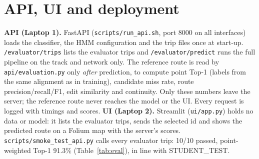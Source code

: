 \documentclass[11pt,a4paper]{article}
\begin{document}
\section{API, UI and deployment}
\textbf{API (Laptop 1).} FastAPI (\texttt{scripts/run\_api.sh}, port 8000 on all interfaces) loads the classifier, the
HMM configuration and the trip files once at start-up. \texttt{/evaluator/trips} lists the evaluator trips and
\texttt{/evaluator/predict} runs the full pipeline on the track and network only. The reference route is read by
\texttt{api/evaluation.py} only \emph{after} prediction, to compute point Top-1 (labels from the same alignment as in
training), candidate miss rate, route precision/recall/F1, edit similarity and continuity. Only these numbers leave
the server; the reference route never reaches the model or the UI. Every request is logged with timings and scores.
\textbf{UI (Laptop 2).} Streamlit (\texttt{ui/app.py}) holds no data or model: it lists the evaluator trips, sends the
selected id and shows the predicted route on a Folium map with the server's scores.
\texttt{scripts/smoke\_test\_api.py} calls every evaluator trip: 10/10 passed, point-weighted Top-1 91.3\%
(Table~\ref{tab:eval}), in line with STUDENT\_TEST.

\begin{table}[H]\centering\small
\caption{Scores computed by the API server after prediction on the 10 EVALUATOR trips (\texttt{scripts/smoke\_test\_api.py}, log in Figure~\ref{fig:api}).}\label{tab:eval}
\end{table}
\end{document}
